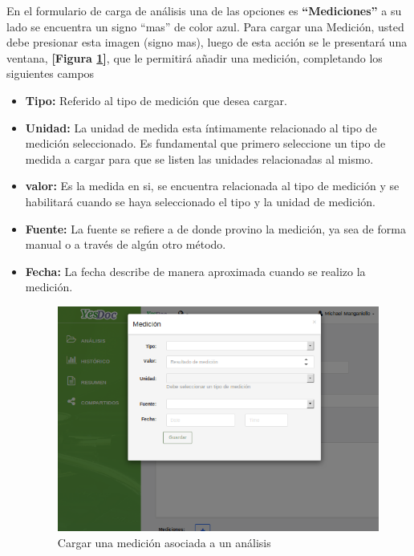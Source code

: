  	En el formulario de carga de análisis una de las opciones es \textbf{``Mediciones''} a su lado se encuentra  un signo ``mas'' de color azul. Para cargar una Medición, usted debe presionar esta imagen (signo mas), luego de esta acción se le presentará una ventana, \textbf{[Figura \ref{mu-cargar_medicion}]}, que le permitirá añadir una medición, completando los siguientes campos
 \begin{itemize}
 	\item \textbf{Tipo: } Referido al tipo de medición que desea cargar.
 	
 	\item \textbf{Unidad: } La unidad de medida esta íntimamente relacionado al tipo de medición seleccionado. Es fundamental que primero seleccione un tipo de medida a cargar para que se listen las unidades relacionadas al mismo.
 	
 	\item \textbf{valor:} Es la medida en si, se encuentra relacionada al tipo de medición y se habilitará cuando se haya seleccionado el tipo y la unidad de medición.
 	\item \textbf{Fuente:} La fuente se refiere a de donde provino la medición, ya sea de forma manual o a través de algún otro método.
 	\item \textbf{Fecha:} La fecha describe de manera aproximada cuando se realizo la medición.
 
 \begin{figure}
 	\centering
 	\includegraphics[width=.8\textwidth]{img/manual_de_usuario/mu-cargar_medicion}
 	\caption{Cargar una medición asociada a un análisis}
 	\label{mu-cargar_medicion}	
 \end{figure}
 	

\end{itemize}
